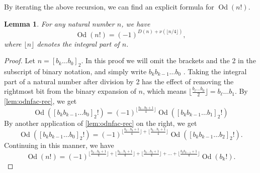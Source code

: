 \documentclass[12pt]{amsart}
\newtheorem{lemma}[theorem]{Lemma}
\theoremstyle{definition}
\numberwithin{equation}{section}
\DeclareMathOperator{\Od}{Od}
\begin{document}
By iterating the above recursion, we can find an explicit formula for $\Od(n!)$.
\begin{lemma}\label{lem:odnfac}
For any natural number $n$, we have \[\Od(n!) = (-1)^{D(n) + \nu(\lfloor n/4 \rfloor)},\] where $\lfloor n \rfloor$ denotes the integral part of $n$.
\end{lemma}
\begin{proof}

Let $n = [b_k\ldots b_0]_2$. In this proof we will omit the brackets and the 2 in the subscript of binary notation, and simply write $b_kb_{k-1}\ldots b_0$ . Taking the integral part of a natural number after division by 2 has the effect of removing the rightmost bit from the binary expansion of $n$, which means $\lfloor \frac{b_\ell\ldots b_0}{2}\rfloor = b_\ell\ldots b_1$. By \cref{lem:odnfac-rec}, we get 
\[
\Od([b_kb_{k-1}\ldots b_0]_2 !) = (-1)^{\lfloor \frac{b_k\ldots b_{0} + 1}{4}\rfloor} \Od([b_kb_{k-1}\ldots b_1]_2 !) 
\]
By another application of \cref{lem:odnfac-rec} on the right, we get 
\[
\Od([b_kb_{k-1}\ldots b_0]_2 !) = (-1)^{\lfloor \frac{b_k\ldots b_{0} + 1}{4}\rfloor + \lfloor \frac{b_k\ldots b_{1} + 1}{4}\rfloor} \Od([b_kb_{k-1}\ldots b_2]_2 !).
\]
Continuing in this manner, we have
\[
\Od(n!) = (-1)^{\lfloor \frac{b_k\ldots b_{0} + 1}{4}\rfloor + \lfloor \frac{b_k\ldots b_{1} + 1}{4}\rfloor + \lfloor \frac{b_k\ldots b_{2} + 1}{4}\rfloor +  \ldots+  \lfloor \frac{b_k b_{k-1} + 1}{4}\rfloor} \Od(b_k!).
\]


\end{proof}
\end{document}
